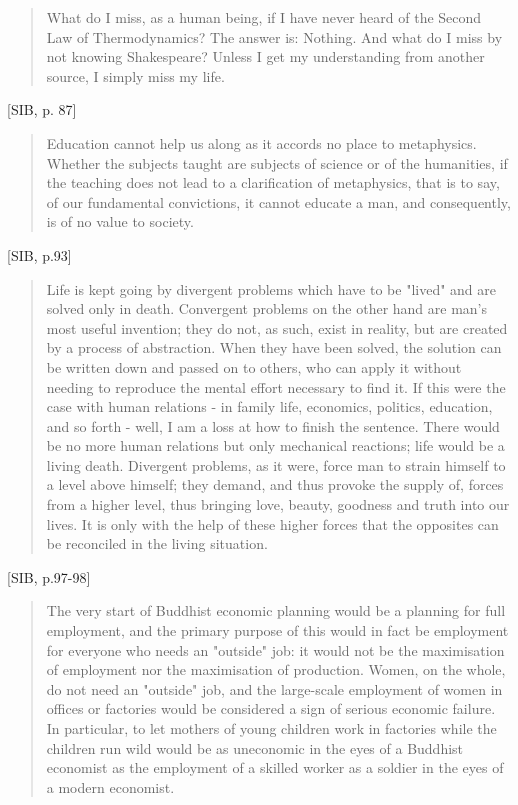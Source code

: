 \begin{quote}
What do I miss, as a human being, if I have never heard of the Second Law of Thermodynamics? The answer is: Nothing. And what do I miss by not knowing Shakespeare? Unless I get my understanding from another source, I simply miss my life.
\end{quote}[SIB, p. 87]

\begin{quote}
  Education cannot help us along as it accords no place to metaphysics. Whether the subjects taught are subjects of science or of the humanities, if the teaching does not lead to a clarification of metaphysics, that is to say, of our fundamental convictions, it cannot educate a man, and consequently, is of no value to society.
\end{quote}[SIB, p.93]

\begin{quote}
  Life is kept going by divergent problems which have to be "lived" and are solved only in death. Convergent problems on the other hand are man's most useful invention; they do not, as such, exist in reality, but are created by a process of abstraction. When they have been solved, the solution can be written down and passed on to others, who can apply it without needing to reproduce the mental effort necessary to find it. If this were the case with human relations - in family life, economics, politics, education, and so forth - well, I am a loss at how to finish the sentence. There would be no more human relations but only mechanical reactions; life would be a living death. Divergent problems, as it were, force man to strain himself to a level above himself; they demand, and thus provoke the supply of, forces from a higher level, thus bringing love, beauty, goodness and truth into our lives. It is only with the help of these higher forces that the opposites can be reconciled in the living situation.
\end{quote} [SIB, p.97-98]


\begin{quote}
The very start of Buddhist economic planning would be a planning for full employment, and the primary purpose of this would in fact be employment for everyone who needs an "outside" job: it would not be the maximisation of employment nor the maximisation of production. Women, on the whole, do not need an "outside" job, and the large-scale employment of women in offices or factories would be considered a sign of serious economic failure. In particular, to let mothers of young children work in factories while the children run wild would be as uneconomic in the eyes of a Buddhist economist as the employment of a skilled worker as a soldier in the eyes of a modern economist.
\end{quote}

